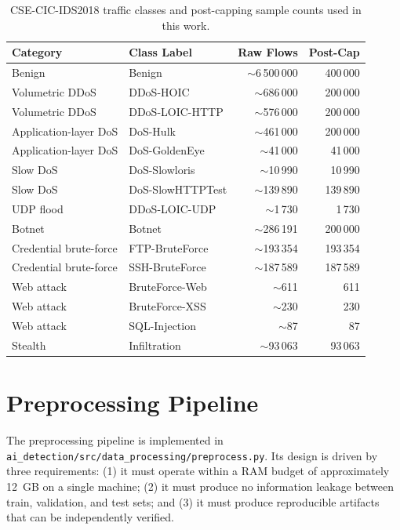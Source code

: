 \documentclass[12pt]{article}
\theoremstyle{plain}
\begin{document}
\begin{table}[H]
\centering
\caption{CSE-CIC-IDS2018 traffic classes and post-capping sample counts used in this work.}
\label{tab:classes}
\begin{tabular}{llrr}
\toprule
\textbf{Category} & \textbf{Class Label} & \textbf{Raw Flows} & \textbf{Post-Cap} \\
\midrule
\rowcolor{lightgray}
Benign & Benign & $\sim$6\,500\,000 & 400\,000 \\
Volumetric DDoS & DDoS-HOIC & $\sim$686\,000 & 200\,000 \\
\rowcolor{lightgray}
Volumetric DDoS & DDoS-LOIC-HTTP & $\sim$576\,000 & 200\,000 \\
Application-layer DoS & DoS-Hulk & $\sim$461\,000 & 200\,000 \\
\rowcolor{lightgray}
Application-layer DoS & DoS-GoldenEye & $\sim$41\,000 & 41\,000 \\
Slow DoS & DoS-Slowloris & $\sim$10\,990 & 10\,990 \\
\rowcolor{lightgray}
Slow DoS & DoS-SlowHTTPTest & $\sim$139\,890 & 139\,890 \\
UDP flood & DDoS-LOIC-UDP & $\sim$1\,730 & 1\,730 \\
\rowcolor{lightgray}
Botnet & Botnet & $\sim$286\,191 & 200\,000 \\
Credential brute-force & FTP-BruteForce & $\sim$193\,354 & 193\,354 \\
\rowcolor{lightgray}
Credential brute-force & SSH-BruteForce & $\sim$187\,589 & 187\,589 \\
Web attack & BruteForce-Web & $\sim$611 & 611 \\
\rowcolor{lightgray}
Web attack & BruteForce-XSS & $\sim$230 & 230 \\
Web attack & SQL-Injection & $\sim$87 & 87 \\
\rowcolor{lightgray}
Stealth & Infiltration & $\sim$93\,063 & 93\,063 \\
\bottomrule
\end{tabular}
\end{table}

\newpage

\section{Preprocessing Pipeline}
\label{sec:preprocessing}

The preprocessing pipeline is implemented in \texttt{ai\_detection/src/data\_processing/preprocess.py}. Its design is driven by three requirements: (1) it must operate within a RAM budget of approximately 12~GB on a single machine; (2) it must produce no information leakage between train, validation, and test sets; and (3) it must produce reproducible artifacts that can be independently verified.
\end{document}
